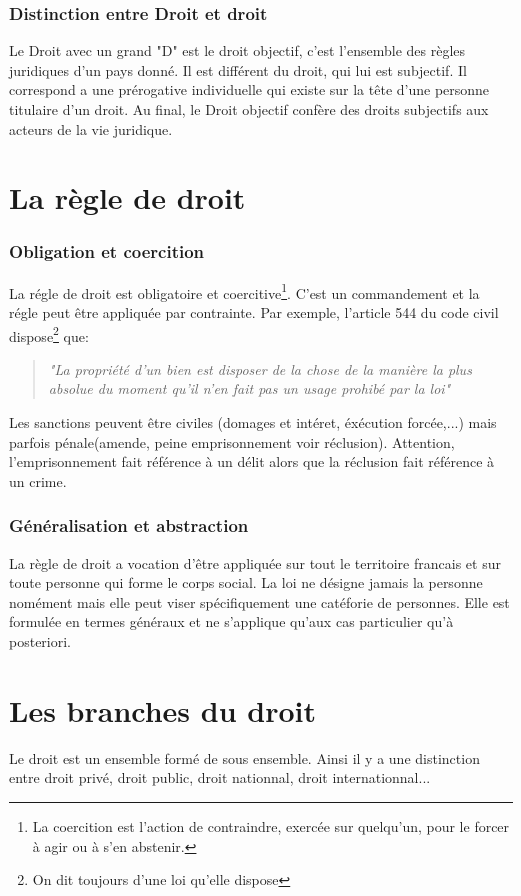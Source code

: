 \documentclass[a4paper]{article}
\begin{document}
		\section{Distinction entre Droit et droit}
			Le Droit avec un grand "D" est le droit objectif, c'est l'ensemble des règles juridiques d'un pays donné. Il est différent du droit, qui lui est subjectif. Il correspond a une prérogative individuelle qui existe sur la tête d'une personne titulaire d'un droit. Au final, le Droit objectif confère des droits subjectifs aux acteurs de la vie juridique. 
	\newpage\part{La règle de droit}
		\section{Obligation et coercition}
			La régle de droit est obligatoire et coercitive\footnote{La coercition est l'action de contraindre, exercée sur quelqu'un, pour le forcer à agir ou à s'en abstenir.}. C'est un commandement et la régle peut être appliquée par contrainte. Par exemple, l'article 544 du code civil dispose\footnote{On dit toujours d'une loi qu'elle dispose} que: 
			\begin{quote}
				\textit{"La propriété d'un bien est disposer de la chose de la manière la plus absolue du moment qu'il n'en fait pas un usage prohibé par la loi"}
			\end{quote}
			Les sanctions peuvent être civiles (domages et intéret, éxécution forcée,...) mais parfois pénale(amende, peine emprisonnement voir réclusion). Attention, l'emprisonnement fait référence à un délit alors que la réclusion fait référence à un crime. 
		\section{Généralisation et abstraction}
			La règle de droit a vocation d'être appliquée sur tout le territoire francais et sur toute personne qui forme le corps social. La loi ne désigne jamais la personne nomément mais elle peut viser spécifiquement une catéforie de personnes. Elle est formulée en termes généraux et ne s'applique qu'aux cas particulier qu'à posteriori.
	\newpage\part{Les branches du droit}
		Le droit est un ensemble formé de sous ensemble. Ainsi il y a une distinction entre droit privé, droit public, droit nationnal, droit internationnal...
\end{document}
